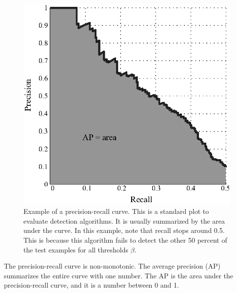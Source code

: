 \begin{figure}
    \centerline{
        \includegraphics[width=.4\linewidth]{figures/object_recognition/example_precision_recall.eps}
    }
    \caption{Example of a precision-recall curve. This is a standard plot to evaluate detection algorithms. It is usually summarized by the area under the curve. In this example, note that recall stops around 0.5. This is because this algorithm fails to detect the other 50 percent of the test examples for all thresholds $\beta$.}
    \label{fig:example_precision_recall}
\end{figure}
The precision-recall curve is non-monotonic. The average precision (AP) summarizes the entire curve with one number. The AP is the area under the precision-recall curve, and it is a number between 0 and 1.








